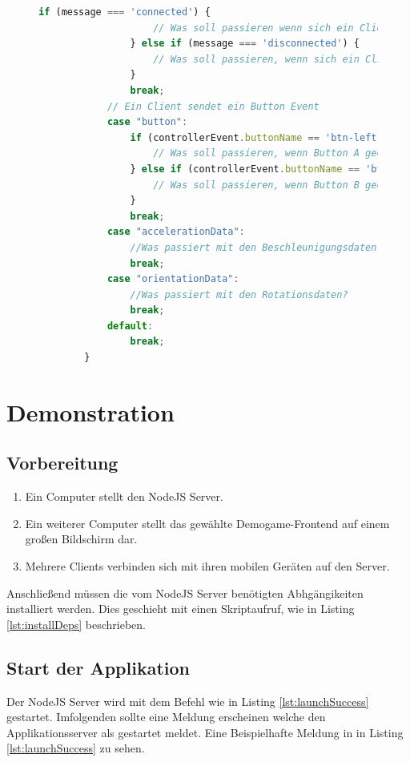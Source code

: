 \documentclass[a4paper]{spie}  %
\begin{document}
\begin{figure}[h!]
\begin{lstlisting}[language=JavaScript,caption={Start der Applikation},label={lst:gameAPI}]
                if (message === 'connected') {
                    // Was soll passieren wenn sich ein Client ins Spiel einloggt
                } else if (message === 'disconnected') {
                    // Was soll passieren, wenn sich ein Client das Spiel verlaesst
                }
                break;
            // Ein Client sendet ein Button Event
            case "button":
                if (controllerEvent.buttonName == 'btn-left' && controllerEvent.buttonState === gameApi.BUTTON.DOWN) {
                    // Was soll passieren, wenn Button A gedrueckt wird
                } else if (controllerEvent.buttonName == 'btn-right' && controllerEvent.buttonState === gameApi.BUTTON.DOWN) {
                    // Was soll passieren, wenn Button B gedrueckt wird
                }
                break;
            case "accelerationData":
                //Was passiert mit den Beschleunigungsdaten?
                break;
            case "orientationData":
                //Was passiert mit den Rotationsdaten?
                break;
            default:
                break;
        }
        \end{lstlisting}
\end{figure}

\section{Demonstration}
\subsection{Vorbereitung}
\begin{enumerate}
 \item Ein Computer stellt den NodeJS Server.
 \item Ein weiterer Computer stellt das gewählte Demogame-Frontend auf einem großen Bildschirm dar.
 \item Mehrere Clients verbinden sich mit ihren mobilen Geräten auf den Server.
\end{enumerate}
Anschließend müssen die vom NodeJS Server benötigten Abhgängikeiten installiert werden. Dies geschieht mit einen Skriptaufruf, wie in Listing \ref{lst:installDeps} beschrieben.
\lstset{
  numbers=left,
  stepnumber=5,
  firstnumber=1,
  numberfirstline=true
}

\subsection{Start der Applikation}
Der NodeJS Server wird mit dem Befehl wie in Listing \ref{lst:launchSuccess} gestartet. Imfolgenden sollte eine Meldung erscheinen welche den Applikationsserver als gestartet meldet. Eine Beispielhafte Meldung in in Listing \ref{lst:launchSuccess} zu sehen.
\end{document}
